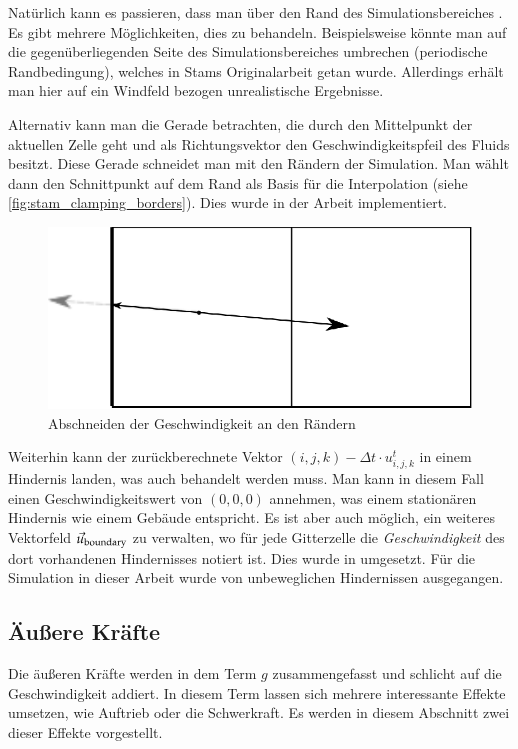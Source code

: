 Natürlich kann es passieren, dass man über den Rand des Simulationsbereiches
. Es gibt mehrere Möglichkeiten, dies zu behandeln.
Beispielsweise könnte man auf die gegenüberliegenden Seite des
Simulationsbereiches umbrechen (periodische Randbedingung), welches in
Stams Originalarbeit getan wurde. Allerdings erhält man hier auf ein
Windfeld bezogen unrealistische Ergebnisse.

Alternativ kann man die Gerade betrachten, die durch den Mittelpunkt
der aktuellen Zelle geht und als Richtungsvektor den
Geschwindigkeitspfeil des Fluids besitzt. Diese Gerade schneidet man
mit den Rändern der Simulation. Man wählt dann den Schnittpunkt auf
dem Rand als Basis für die Interpolation (siehe
\autoref{fig:stam_clamping_borders}). Dies wurde in der Arbeit
implementiert.

\begin{figure}[ht]
\centering
\includegraphics[width=12cm]{images/advection_clamping_borders}
\caption{Abschneiden der Geschwindigkeit an den Rändern}
\label{fig:stam_clamping_borders}
\end{figure}

Weiterhin kann der zurückberechnete Vektor $(i,j,k) - \Delta t \cdot
u_{i,j,k}^t$ in einem Hindernis landen, was auch behandelt werden
muss. Man kann in diesem Fall einen Geschwindigkeitswert von $(0,0,0)$
annehmen, was einem stationären Hindernis wie einem Gebäude
entspricht. Es ist aber auch möglich, ein weiteres Vektorfeld
$\vec{u}_{\textnormal{boundary}}$ zu verwalten, wo für jede
Gitterzelle die \emph{Geschwindigkeit} des dort vorhandenen
Hindernisses notiert ist. Dies wurde in \cite{Crane2007}
umgesetzt. Für die Simulation in dieser Arbeit wurde von unbeweglichen
Hindernissen ausgegangen.

\subsection{Äußere Kräfte}

Die äußeren Kräfte werden in dem Term $g$ zusammengefasst und schlicht
auf die Geschwindigkeit addiert. In diesem Term lassen sich mehrere
interessante Effekte umsetzen, wie Auftrieb oder die Schwerkraft. Es
werden in diesem Abschnitt zwei dieser Effekte vorgestellt.

